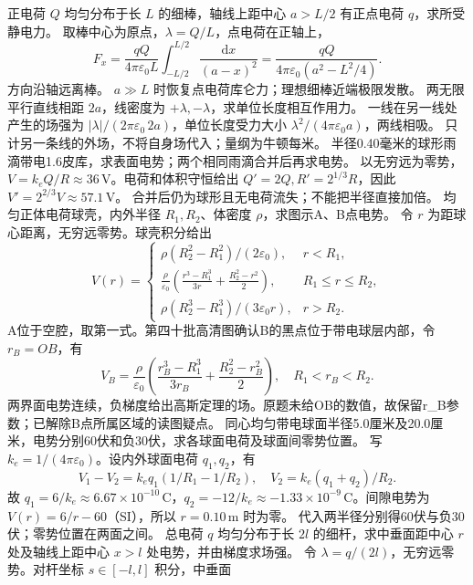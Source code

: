\problemtext 正电荷 $Q$ 均匀分布于长 $L$ 的细棒，轴线上距中心 $a>L/2$ 有正点电荷 $q$，求所受静电力。
\workings 取棒中心为原点，$\lambda=Q/L$，点电荷在正轴上，
\[
F_x=\frac{qQ}{4\pi\varepsilon_0L}\int_{-L/2}^{L/2}\frac{\mathrm dx}{(a-x)^2}
=\frac{qQ}{4\pi\varepsilon_0(a^2-L^2/4)}.
\]
方向沿轴远离棒。
\crosscheck $a\gg L$ 时恢复点电荷库仑力；理想细棒近端极限发散。
\problemtext 两无限平行直线相距 $2a$，线密度为 $+\lambda,-\lambda$，求单位长度相互作用力。
\workings 一线在另一线处产生的场强为 $|\lambda|/(2\pi\varepsilon_0\,2a)$，单位长度受力大小 $\lambda^2/(4\pi\varepsilon_0a)$，两线相吸。
\crosscheck 只计另一条线的外场，不将自身场代入；量纲为牛顿每米。
\problemtext 半径0.40毫米的球形雨滴带电1.6皮库，求表面电势；两个相同雨滴合并后再求电势。
\workings 以无穷远为零势，$V=k_eQ/R\approx36\,\mathrm V$。电荷和体积守恒给出 $Q'=2Q,R'=2^{1/3}R$，因此 $V'=2^{2/3}V\approx57.1\,\mathrm V$。
\crosscheck 合并后仍为球形且无电荷流失；不能把半径直接加倍。
\problemtext 均匀正体电荷球壳，内外半径 $R_1,R_2$、体密度 $\rho$，求图示A、B点电势。
\workings 令 $r$ 为距球心距离，无穷远零势。球壳积分给出
\[
V(r)=\begin{cases}
\rho(R_2^2-R_1^2)/(2\varepsilon_0),&r<R_1,\\
\frac{\rho}{\varepsilon_0}\left(\frac{r^3-R_1^3}{3r}+\frac{R_2^2-r^2}{2}\right),&R_1\le r\le R_2,\\
\rho(R_2^3-R_1^3)/(3\varepsilon_0r),&r>R_2.
\end{cases}
\]
A位于空腔，取第一式。第四十批高清图确认B的黑点位于带电球层内部，令 $r_B=OB$，有
\[
V_B=\frac{\rho}{\varepsilon_0}\left(\frac{r_B^3-R_1^3}{3r_B}+\frac{R_2^2-r_B^2}{2}\right),\quad R_1<r_B<R_2 .
\]
\crosscheck 两界面电势连续，负梯度给出高斯定理的场。原题未给OB的数值，故保留r_B参数；已解除B点所属区域的读图疑点。
\problemtext 同心均匀带电球面半径5.0厘米及20.0厘米，电势分别60伏和负30伏，求各球面电荷及球面间零势位置。
\workings 写 $k_e=1/(4\pi\varepsilon_0)$。设内外球面电荷 $q_1,q_2$，有
\[
V_1-V_2=k_eq_1(1/R_1-1/R_2),\quad V_2=k_e(q_1+q_2)/R_2.
\]
故 $q_1=6/k_e\approx6.67\times10^{-10}\,\mathrm C$，$q_2=-12/k_e\approx-1.33\times10^{-9}\,\mathrm C$。间隙电势为 $V(r)=6/r-60$（SI），所以 $r=0.10\,\mathrm m$ 时为零。
\crosscheck 代入两半径分别得60伏与负30伏；零势位置在两面之间。
\problemtext 总电荷 $q$ 均匀分布于长 $2l$ 的细杆，求中垂面距中心 $r$ 处及轴线上距中心 $x>l$ 处电势，并由梯度求场强。
\workings 令 $\lambda=q/(2l)$，无穷远零势。对杆坐标 $s\in[-l,l]$ 积分，中垂面
